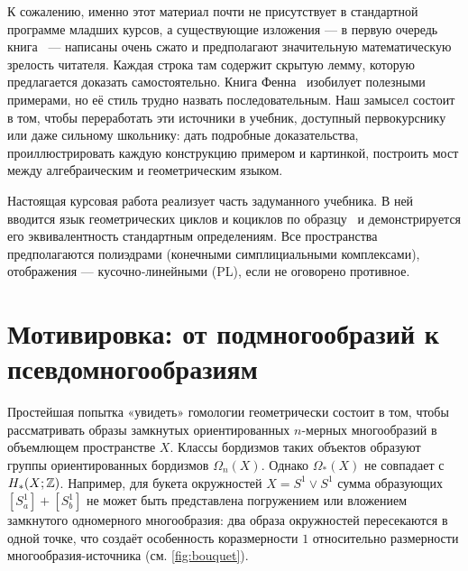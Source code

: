 \documentclass[12pt, twoside]{article}
\begin{document}
К сожалению, именно этот материал почти не присутствует в стандартной программе младших курсов, а существующие изложения --- в первую очередь книга~\cite{BRS} --- написаны очень сжато и предполагают значительную математическую зрелость читателя. Каждая строка там содержит скрытую лемму, которую предлагается доказать самостоятельно. Книга Фенна~\cite{Fenn} изобилует полезными примерами, но её стиль трудно назвать последовательным. Наш замысел состоит в том, чтобы переработать эти источники в учебник, доступный первокурснику или даже сильному школьнику: дать подробные доказательства, проиллюстрировать каждую конструкцию примером и картинкой, построить мост между алгебраическим и геометрическим языком.

Настоящая курсовая работа реализует часть задуманного учебника. В ней вводится язык геометрических циклов и коциклов по образцу~\cite{BRS} и демонстрируется его эквивалентность стандартным определениям. Все пространства предполагаются полиэдрами (конечными симплициальными комплексами), отображения --- кусочно‑линейными (PL), если не оговорено противное.

\section{Мотивировка: от подмногообразий к псевдомногообразиям}

Простейшая попытка «увидеть» гомологии геометрически состоит в том, чтобы рассматривать образы замкнутых ориентированных $n$-мерных многообразий в объемлющем пространстве $X$. Классы бордизмов таких объектов образуют группы ориентированных бордизмов $\Omega_n(X)$. Однако $\Omega_*(X)$ не совпадает с $H_*(X;\mathbb Z)$. Например, для букета окружностей $X = S^1 \vee S^1$ сумма образующих $[S^1_a] + [S^1_b]$ не может быть представлена погружением или вложением замкнутого одномерного многообразия: два образа окружностей пересекаются в одной точке, что создаёт особенность коразмерности $1$ относительно размерности многообразия-источника (см. \cref{fig:bouquet}).
\end{document}
